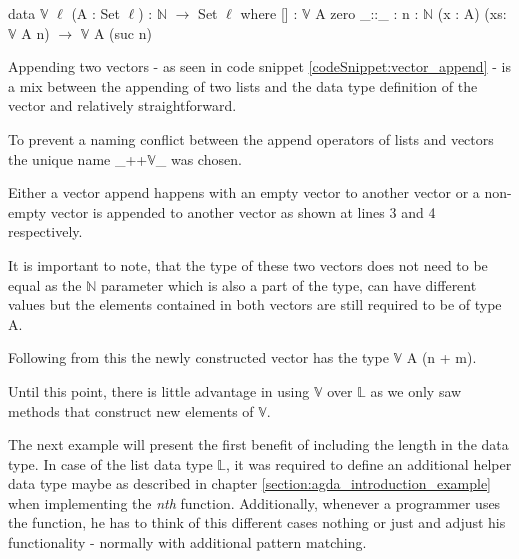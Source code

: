 \begin{codesnippet}[mathescape=true, caption={Definition of the vector data type in Agda}, label={codeSnippet:vector_data type}]
data $\mathbb{V}$ {$\ell$} (A : Set $\ell$) : $\mathbb{N}$ $\rightarrow$ Set $\ell$ where
  [] : $\mathbb{V}$ A zero
  _::_ : {n : $\mathbb{N}$} (x : A) (xs: $\mathbb{V}$ A n) $\rightarrow$
         $\mathbb{V}$ A (suc n)
\end{codesnippet}

Appending two vectors - as seen in code snippet \ref{codeSnippet:vector_append} - is a mix between the appending of two lists and the data type definition of the vector and relatively straightforward.

To prevent a naming conflict between the append operators of lists and vectors the unique name \_++$\mathbb{V}$\_ was chosen.

Either a vector append happens with an empty vector to another vector or a non-empty vector is appended to another vector as shown at lines 3 and 4 respectively.

It is important to note, that the type of these two vectors does not need to be equal as the $\mathbb{N}$ parameter which is also a part of the type, can have different values but the elements contained in both vectors are still required to be of type A.

Following from this the newly constructed vector has the type $\mathbb{V}$ A (n + m).
\begin{codesnippet}[mathescape=true, caption={Definition of the vector append function in Agda}, label={codeSnippet:vector_append}]
_++$\mathbb{V}$_ : $\forall$ {$\ell$} {A : Set $\ell$}  {n m: $\mathbb{N}$ $\rightarrow$
        $\mathbb{V}$ A n $\rightarrow \mathbb{V}$ A m $\rightarrow \mathbb{V}$ A (n + m)
  []        ++$\mathbb{V}$ ys = ys
  (x :: xs) ++$\mathbb{V}$ ys = x :: (xs ++$\mathbb{V}$ ys)
\end{codesnippet}

Until this point, there is little advantage in using $\mathbb{V}$ over $\mathbb{L}$ as we only saw methods that construct new elements of $\mathbb{V}$.

The next example will present the first benefit of including the length in the data type.
In case of the list data type $\mathbb{L}$, it was required to define an additional helper data type maybe as described in chapter \ref{section:agda_introduction_example} when implementing the \emph{nth} function.
Additionally, whenever a programmer uses the function, he has to think of this different cases nothing or just and adjust his functionality - normally with additional pattern matching.

